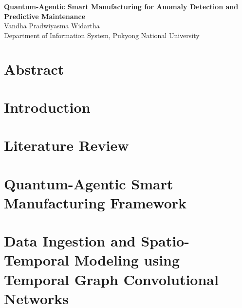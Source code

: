 \documentclass[11pt]{report}
\begin{document}
\newpage
\vspace{1em}
\begingroup
\let\clearpage\relax
\let\cleardoublepage\relax
\begin{center}
{\large \textbf{Quantum-Agentic Smart Manufacturing for Anomaly Detection and Predictive Maintenance}}\\[0.8em]
Vandha Pradwiyasma Widartha\\[0.2em]
Department of Information System, Pukyong National University\\[0.2em]
\end{center}
\vspace{1em}
\chapter*{Abstract}

\endgroup


\clearpage
{}
\setcounter{page}{1}

\chapter{Introduction}


\renewcommand{\thechapter}{\arabic{chapter}}
\renewcommand{\thesection}{\thechapter.\arabic{section}}
\chapter{Literature Review}

\renewcommand{\thechapter}{\arabic{chapter}}
\renewcommand{\thesection}{\thechapter.\arabic{section}}

\chapter{Quantum-Agentic Smart Manufacturing Framework}
% 


\chapter{Data Ingestion and Spatio-Temporal Modeling using Temporal Graph Convolutional Networks}
\label{chap:tgcn}
% 

\end{document}
